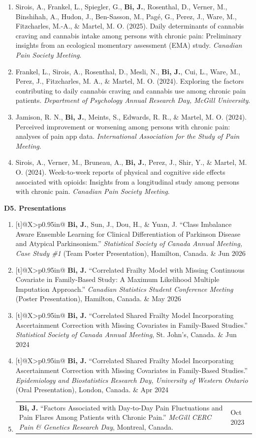 \documentclass[10pt]{article}
\makeatletter
\newcommand{\cvsubsection}[1]{%
  \Needspace{4\baselineskip}%
  \vspace{0.3em}%
  {\bfseries #1}\par
}
\newcommand{\talkitem}[2]{%
  \item \leavevmode\begin{tabularx}{\linewidth}[t]{@{}X>{\raggedleft\arraybackslash}p{0.95in}@{}}
    #1 & {\color{dategray} #2}
  \end{tabularx}
}
\makeatother
\begin{document}
\begin{enumerate}[leftmargin=1.6em]
\item Sirois, A., Frankel, L., Spiegler, G., \textbf{Bi, J.}, Rosenthal, D., Verner, M., Binshihah, A., Hudon, J., Ben-Sasson, M., Pag\'{e}, G., Perez, J., Ware, M., Fitzcharles, M.-A., \& Martel, M. O. (2025). Daily determinants of cannabis craving and cannabis intake among persons with chronic pain: Preliminary insights from an ecological momentary assessment (EMA) study. \emph{Canadian Pain Society Meeting}.

\item Frankel, L., Sirois, A., Rosenthal, D., Mesli, N., \textbf{Bi, J.}, Cui, L., Ware, M., Perez, J., Fitzcharles, M. A., \& Martel, M. O. (2024). Exploring the factors contributing to daily cannabis craving and cannabis use among chronic pain patients. \emph{Department of Psychology Annual Research Day, McGill University}.

\item Jamison, R. N., \textbf{Bi, J.}, Meints, S., Edwards, R. R., \& Martel, M. O. (2024). Perceived improvement or worsening among persons with chronic pain: analyses of pain app data. \emph{International Association for the Study of Pain Meeting}.

\item Sirois, A., Verner, M., Bruneau, A., \textbf{Bi, J.}, Perez, J., Shir, Y., \& Martel, M. O. (2024). Week-to-week reports of physical and cognitive side effects associated with opioids: Insights from a longitudinal study among persons with chronic pain. \emph{Canadian Pain Society Meeting}.
\end{enumerate}

\cvsubsection{D5. Presentations}
\begin{enumerate}[leftmargin=1.6em]
\talkitem{\textbf{Bi, J.}, Sun, J., Dou, H., \& Yuan, J. ``Class Imbalance Aware Ensemble Learning for Clinical Differentiation of Parkinson Disease and Atypical Parkinsonism.'' \emph{Statistical Society of Canada Annual Meeting, Case Study \#1} (Team Poster Presentation), Hamilton, Canada.}{Jun 2026}
\talkitem{\textbf{Bi, J.} ``Correlated Frailty Model with Missing Continuous Covariate in Family-Based Study: A Maximum Likelihood Multiple Imputation Approach.'' \emph{Canadian Statistics Student Conference Meeting} (Poster Presentation), Hamilton, Canada.}{May 2026}
\talkitem{\textbf{Bi, J.} ``Correlated Shared Frailty Model Incorporating Ascertainment Correction with Missing Covariates in Family-Based Studies.'' \emph{Statistical Society of Canada Annual Meeting}, St. John's, Canada.}{Jun 2024}
\talkitem{\textbf{Bi, J.} ``Correlated Shared Frailty Model Incorporating Ascertainment Correction with Missing Covariates in Family-Based Studies.'' \emph{Epidemiology and Biostatistics Research Day, University of Western Ontario} (Oral Presentation), London, Canada.}{Apr 2024}
\talkitem{\textbf{Bi, J.} ``Factors Associated with Day-to-Day Pain Fluctuations and Pain Flares Among Patients with Chronic Pain.'' \emph{McGill CERC Pain \& Genetics Research Day}, Montreal, Canada.}{Oct 2023}
\end{enumerate}
\end{document}
